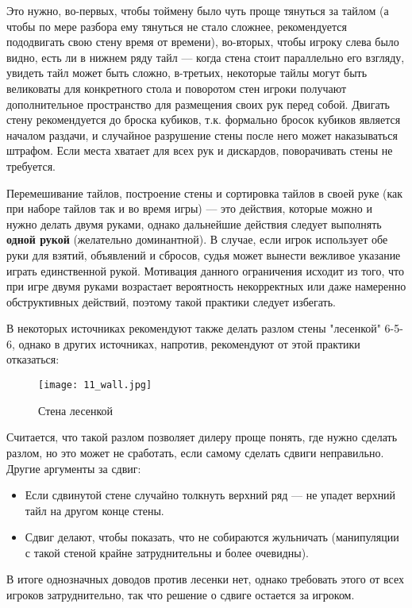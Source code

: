 Это нужно, во-первых, чтобы тоймену было чуть проще тянуться за тайлом (а чтобы по мере разбора ему тянуться не стало сложнее, рекомендуется пододвигать свою стену время от времени), во-вторых, чтобы игроку слева было видно, есть ли в нижнем ряду тайл --- когда стена стоит параллельно его взгляду, увидеть тайл может быть сложно, в-третьих, некоторые тайлы могут быть великоваты для конкретного стола и поворотом стен игроки получают дополнительное пространство для размещения своих рук перед собой. Двигать стену рекомендуется до броска кубиков, т.к. формально бросок кубиков является началом раздачи, и случайное разрушение стены после него может наказываться штрафом. Если места хватает для всех рук и дискардов, поворачивать стены не требуется.

Перемешивание тайлов, построение стены и сортировка тайлов в своей руке (как при наборе тайлов так и во время игры) --- это действия, которые можно и нужно делать двумя руками, однако дальнейшие действия следует выполнять \textbf{одной рукой} (желательно доминантной). В случае, если игрок использует обе руки для взятий, объявлений и сбросов, судья может вынести вежливое указание играть единственной рукой. Мотивация данного ограничения исходит из того, что при игре двумя руками возрастает вероятность некорректных или даже намеренно обструктивных действий, поэтому такой практики следует избегать.

В некоторых источниках рекомендуют также делать разлом стены "лесенкой" 6-5-6, однако в других источниках, напротив, рекомендуют от этой практики отказаться:

\begin{figure}[H]
	\centering
	\texttt{[image: 11\_wall.jpg]}
	\caption{Стена лесенкой}
\end{figure}

Считается, что такой разлом позволяет дилеру проще понять, где нужно сделать разлом, но это может не сработать, если самому сделать сдвиги неправильно. Другие аргументы за сдвиг:
\begin{itemize}
	\item Если сдвинутой стене случайно толкнуть верхний ряд --- не упадет верхний тайл на другом конце стены.
	\item Сдвиг делают, чтобы показать, что не собираются жульничать (манипуляции с такой стеной крайне затруднительны и  более очевидны).
\end{itemize} 
В итоге однозначных доводов против лесенки нет, однако требовать этого от всех игроков затруднительно, так что решение о сдвиге остается за игроком.

